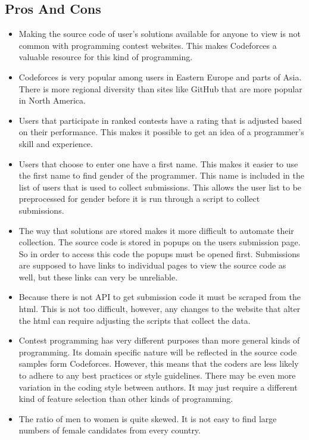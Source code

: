\documentclass{article}
\begin{document}
\subsection{Pros And Cons}
\begin{itemize}
    \item Making the source code of user's solutions available for anyone to view is not common with programming contest websites. This makes Codeforces a valuable resource for this kind of programming.
    
    \item Codeforces is very popular among users in Eastern Europe and parts of Asia. There is more regional diversity than sites like GitHub that are more popular in North America.
    
    \item Users that participate in ranked contests have a rating that is adjusted based on their performance. This makes it possible to get an idea of a programmer's skill and experience.
    
    \item Users that choose to enter one have a first name. This makes it easier to use the first name to find gender of the programmer. This name is included in the list of users that is used to collect submissions. This allows the user list to be preprocessed for gender before it is run through a script to collect submissions.

    \item The way that solutions are stored makes it more difficult to automate their collection. The source code is stored in popups on the users submission page. So in order to access this code the popups must be opened first. Submissions are supposed to have links to individual pages to view the source code as well, but these links can very be unreliable.

    \item Because there is not API to get submission code it must be scraped from the html. This is not too difficult, however, any changes to the website that alter the html can require adjusting the scripts that collect the data.

    \item Contest programming has very different purposes than more general kinds of programming. Its domain specific nature will be reflected in the source code samples form Codeforces. However, this means that the coders are less likely to adhere to any best practices or style guidelines. There may be even more variation in the coding style between authors. It may just require a different kind of feature selection than other kinds of programming.

    \item The ratio of men to women is quite skewed. It is not easy to find large numbers of female candidates from every country.
\end{itemize}
\end{document}
